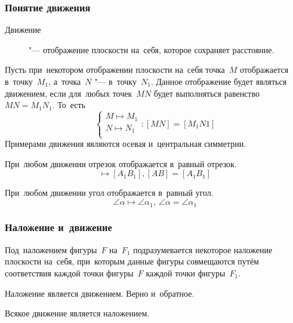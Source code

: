 \documentclass[]{scrartcl}
\begin{document}
\subsubsection{Понятие движения}
\begin{description}
	\item[Движение] "--- отображение плоскости на~себя, которое сохраняет расстояние.
\end{description}
Пусть при~некотором отображении плоскости на~себя точка~${\textstyle M}$ отображается в~точку~${\textstyle M_{1}}$, а~точка~${\textstyle N}$ "--- в~точку~${\textstyle N_{1}}$. Данное отображение будет являться движением, если для~любых точек~${\textstyle MN}$ будет выполняться равенство~${\textstyle MN=M_{1}N_{1}}$. То~есть
\begin{equation}\label{eq:moving-1}
\begin{cases}
M \mapsto M_{1}\\
N \mapsto N_{1}\\
\end{cases}
:[MN]=[M_{1}N{1}]
\end{equation}
Примерами движения являются осевая и~центральная симметрии.
\begin{theorem}
	При~любом движении отрезок отображается в~равный отрезок.
	\begin{equation}
		[AB] \mapsto [A_{1}B_{1}], [AB] = [A_{1}B_{1}]
	\end{equation}
\end{theorem}  

\begin{theorem}
	При~любом движении угол отображается в~равный угол.
	\begin{equation}
	\angle \alpha \mapsto \angle \alpha_{1},\ \angle \alpha = \angle \alpha_{1}
	\end{equation}
\end{theorem} 

\subsubsection{Наложение и~движение}
Под~наложением фигуры~${\textstyle F}$ на~${\textstyle F_{1}}$ подразумевается некоторое наложение плоскости на~себя, при~которым данные фигуры совмещаются путём соответствия каждой точки фигуры~${\textstyle F}$ каждой точки фигуры~${\textstyle F_{1}}$.

Наложение является движением. Верно и~обратное.
\begin{theorem}
	Всякое движение является наложением.
\end{theorem}
\end{document}
